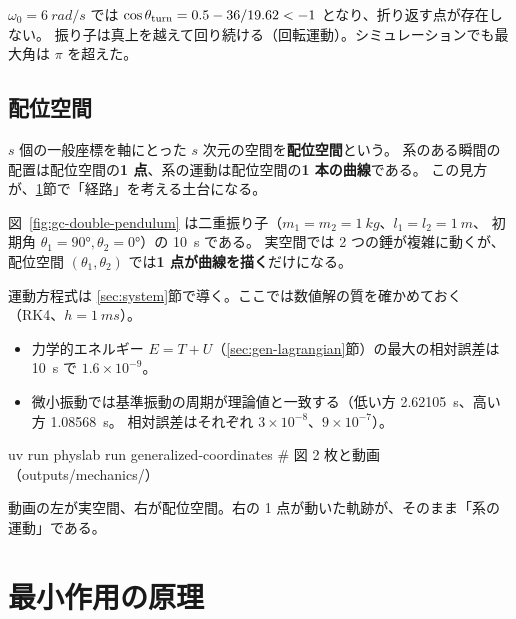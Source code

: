 $\omega_0=\qty{6}{rad/s}$ では $\cos\theta_{\rm turn}=0.5-36/19.62<-1$ となり、折り返す点が存在しない。
振り子は真上を越えて回り続ける（回転運動）。シミュレーションでも最大角は $\pi$ を超えた。

\subsection{配位空間}

$s$ 個の一般座標を軸にとった $s$ 次元の空間を\textbf{配位空間}という。
系のある瞬間の配置は配位空間の\textbf{1 点}、系の運動は配位空間の\textbf{1 本の曲線}である。
この見方が、\ref{sec:least-action}節で「経路」を考える土台になる。

図~\ref{fig:gc-double-pendulum} は二重振り子（$m_1=m_2=\qty{1}{kg}$、$l_1=l_2=\qty{1}{m}$、
初期角 $\theta_1=\ang{90},\theta_2=\ang{0}$）の \qty{10}{s} である。
実空間では 2 つの錘が複雑に動くが、配位空間 $(\theta_1,\theta_2)$ では\textbf{1 点が曲線を描く}だけになる。


運動方程式は \ref{sec:system}節で導く。ここでは数値解の質を確かめておく（RK4、$h=\qty{1}{ms}$）。
\begin{itemize}
  \item 力学的エネルギー $E=T+U$（\ref{sec:gen-lagrangian}節）の最大の相対誤差は \qty{10}{s} で $1.6\times10^{-9}$。
  \item 微小振動では基準振動の周期が理論値と一致する（低い方 \qty{2.62105}{s}、高い方 \qty{1.08568}{s}。
    相対誤差はそれぞれ $3\times10^{-8}$、$9\times10^{-7}$）。
\end{itemize}

\begin{simbox}
\begin{terminal}
uv run physlab run generalized-coordinates      # 図 2 枚と動画（outputs/mechanics/）
\end{terminal}
動画の左が実空間、右が配位空間。右の 1 点が動いた軌跡が、そのまま「系の運動」である。
\end{simbox}

\section{最小作用の原理}\label{sec:least-action}

